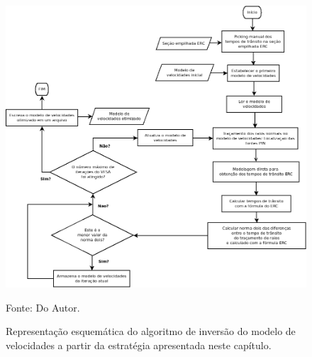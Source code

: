 \begin{figure}[H]
\caption{Representação esquemática do algoritmo de inversão do modelo de velocidades
a partir da estratégia apresentada neste capítulo.}
\begin{center}
\includegraphics[scale=0.45]{images/fluxocomp.png}
\vspace{-0.3cm}
\end{center}
\begin{center}
 Fonte: Do Autor.
\end{center}
\label{fig:9.9}
\end{figure}

